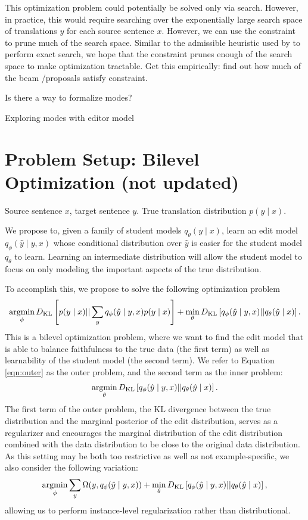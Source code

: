 \documentclass[11pt]{article}
\begin{document}
This optimization problem could potentially be solved only via search.
However, in practice, this would require searching over the exponentially large search space
of translations $y$ for each source sentence $x$.
However, we can use the constraint to prune much of the search space.
Similar to the admissible heuristic used by \citet{catgotyourtongue} to perform
exact search, we hope that the constraint prunes enough of the search space to make optimization
tractable.
{\color{red}Get this empirically: find out how much of the beam /proposals satisfy constraint}.

{\color{red}Is there a way to formalize modes?}

{\color{red}Exploring modes with editor model}

\section{Problem Setup: Bilevel Optimization (not updated)}
Source sentence $x$, target sentence $y$.
True translation distribution $p(y \mid x)$.

We propose to, given a family of student models $q_\theta(y \mid x)$,
learn an edit model $q_\phi(\hat{y} \mid y, x)$ whose conditional distribution over $\hat{y}$
is easier for the student model $q_\theta$ to learn.
Learning an intermediate distribution will allow the student model to focus on only modeling
the important aspects of the true distribution.

To accomplish this, we propose to solve the following optimization problem
\begin{equation}
    \label{eqn:outer}
    \operatorname*{argmin}_\phi D_\mathrm{KL}\left[p(y \mid x) || \sum_y q_\phi(\hat{y} \mid y, x)p(y \mid x)\right]
    + \min_\theta D_\mathrm{KL}\left[q_\phi(\hat{y} \mid y, x) || q_\theta(\hat{y} \mid x)\right].
\end{equation}
This is a bilevel optimization problem, where we want to find the edit model
that is able to balance faithfulness to the true data (the first term)
as well as learnability of the student model (the second term).
We refer to Equation \ref{eqn:outer} as the outer problem,
and the second term as the inner problem:
\begin{equation}
    \label{eqn:inner}
    \operatorname*{argmin}_\theta D_\mathrm{KL}\left[q_\phi(\hat{y} \mid y, x) || q_\theta(\hat{y} \mid x)\right].
\end{equation}
The first term of the outer problem, the KL divergence between the true distribution
and the marginal posterior of the edit distribution,
serves as a regularizer and encourages the marginal distribution of
the edit distribution combined with the data distribution to be close to the
original data distribution.
As this setting may be both too restrictive as well as not example-specific,
we also consider the following variation:
\begin{equation}
    \label{eqn:regularized-bilevel}
    \operatorname*{argmin}_\phi \sum_y \Omega(y, q_\phi(\hat{y} \mid y, x))
    + \min_\theta D_\mathrm{KL}\left[q_\phi(\hat{y} \mid y, x) || q_\theta(\hat{y} \mid x)\right],
\end{equation}
allowing us to perform instance-level regularization rather than distributional.
\end{document}
